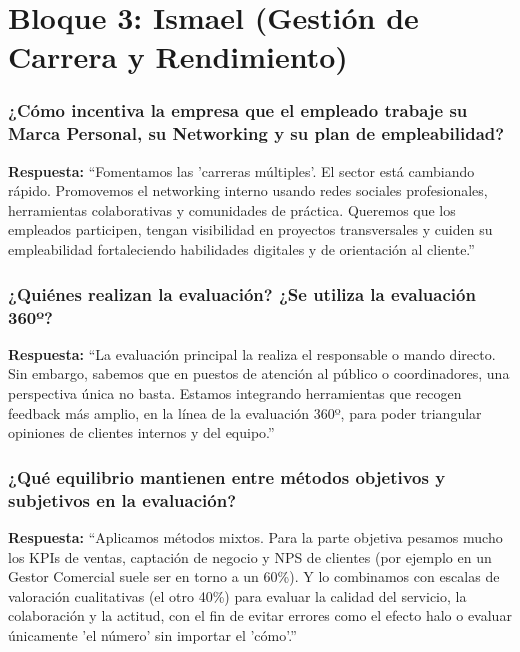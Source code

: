 \section{Bloque 3: Ismael (Gestión de Carrera y Rendimiento)}

\subsubsection*{¿Cómo incentiva la empresa que el empleado trabaje su Marca Personal, su Networking y su plan de empleabilidad?}

\textbf{Respuesta:}\newline
``Fomentamos las 'carreras múltiples'. El sector está cambiando rápido. Promovemos el networking interno usando redes sociales profesionales, herramientas colaborativas y comunidades de práctica. Queremos que los empleados participen, tengan visibilidad en proyectos transversales y cuiden su empleabilidad fortaleciendo habilidades digitales y de orientación al cliente.''

\subsubsection*{¿Quiénes realizan la evaluación? ¿Se utiliza la evaluación 360º?}

\textbf{Respuesta:}\newline
``La evaluación principal la realiza el responsable o mando directo. Sin embargo, sabemos que en puestos de atención al público o coordinadores, una perspectiva única no basta. Estamos integrando herramientas que recogen feedback más amplio, en la línea de la evaluación 360º, para poder triangular opiniones de clientes internos y del equipo.''

\subsubsection*{¿Qué equilibrio mantienen entre métodos objetivos y subjetivos en la evaluación?}

\textbf{Respuesta:}\newline
``Aplicamos métodos mixtos. Para la parte objetiva pesamos mucho los KPIs de ventas, captación de negocio y NPS de clientes (por ejemplo en un Gestor Comercial suele ser en torno a un 60\%). Y lo combinamos con escalas de valoración cualitativas (el otro 40\%) para evaluar la calidad del servicio, la colaboración y la actitud, con el fin de evitar errores como el efecto halo o evaluar únicamente 'el número' sin importar el 'cómo'.''


